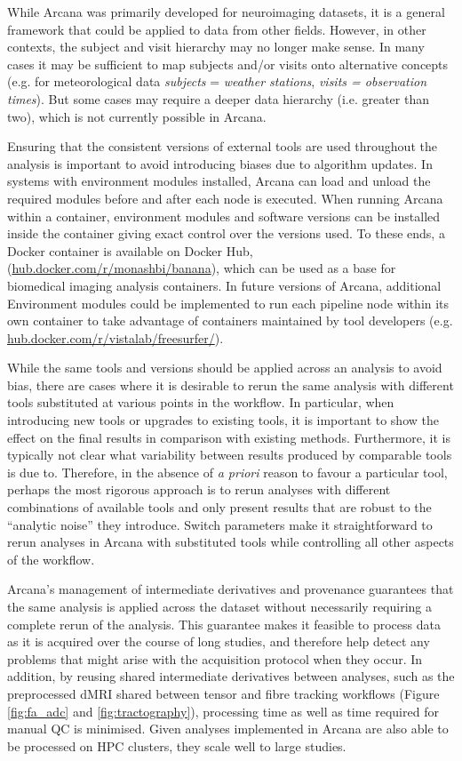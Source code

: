 \documentclass[smallextended]{svjour3}       %
\begin{document}
While Arcana was primarily developed for neuroimaging datasets, it is a
general framework that could be applied to data from other fields.
However, in other contexts, the subject and visit hierarchy may no
longer make sense. In many cases it may be sufficient to map subjects
and/or visits onto alternative concepts (e.g. for meteorological data
\emph{subjects} = \emph{weather stations}, \emph{visits = observation
times}). But some cases may require a deeper data hierarchy (i.e.
greater than two), which is not currently possible in Arcana.

Ensuring that the consistent versions of external tools are used
throughout the analysis is important to avoid introducing biases due to
algorithm updates. In systems with environment modules \citep{furlani_modules:_1991}
installed, Arcana can load and unload the required modules before and
after each node is executed. When running Arcana within a container,
environment modules and software versions can be installed inside the
container giving exact control over the versions used. To these ends, a
Docker container is available on Docker Hub,
(\url{hub.docker.com/r/monashbi/banana}), which can be used as a
base for biomedical imaging analysis containers. In future versions of Arcana,
additional Environment modules could be implemented to run each pipeline
node within its own container to take advantage of
containers maintained by tool developers (e.g. 
\url{hub.docker.com/r/vistalab/freesurfer/}).

While the same tools and versions should be applied across an analysis
to avoid bias, there are cases where it is desirable to rerun the same
analysis with different tools substituted at various points in the
workflow. In particular, when introducing new tools or upgrades to
existing tools, it is important to show the effect on the final results
in comparison with existing methods. Furthermore, it is typically not
clear what variability between results produced by comparable tools is
due to. Therefore, in the absence of \emph{a priori} reason to favour a
particular tool, perhaps the most rigorous approach is to rerun analyses
with different combinations of available tools and only present results
that are robust to the ``analytic noise'' \citep{maumet:inserm-01886089} they introduce.
Switch parameters make it straightforward to rerun analyses in Arcana
with substituted tools while controlling all other aspects of the
workflow.

Arcana's management of intermediate derivatives and provenance
guarantees that the same analysis is applied across the dataset without
necessarily requiring a complete rerun of the analysis. This guarantee
makes it feasible to process data as it is acquired over the course of
long studies, and therefore help detect any problems that might arise
with the acquisition protocol when they occur. In addition, by reusing
shared intermediate derivatives between analyses, such as the
preprocessed dMRI shared between tensor and fibre tracking workflows
(Figure \ref{fig:fa_adc} and \ref{fig:tractography}), processing time as
well as time required for manual
QC is minimised. Given analyses implemented in Arcana are also able to
be processed on HPC clusters, they scale well to large studies.
\end{document}
